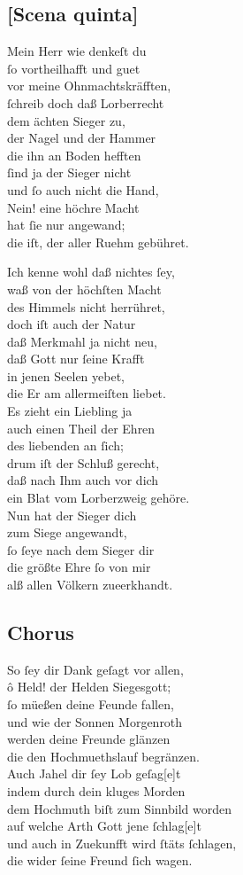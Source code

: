 \documentclass{ees}
\newenvironment{lyrics}[1]{%
  \subsection{#1}\nopagebreak%
  \begin{lyricslist}%
  \let\voice\item%
}{%
  \end{lyricslist}%
}
\begin{document}
\begin{lyrics}{[Scena quinta]}
  \voice[Jahel]
  Mein Herr wie denkeſt du\\
  ſo vortheilhafft und guet\\
  vor meine Ohnmachtskräfften,\\
  ſchreib doch daß Lorberrecht\\
  dem ächten Sieger zu,\\
  der Nagel und der Hammer\\
  die ihn an Boden hefften\\
  ſind ja der Sieger nicht\\
  und ſo auch nicht die Hand,\\
  Nein! eine höchre Macht\\
  hat ſie nur angewand;\\
  die iſt, der aller Ruehm gebühret.

  \voice[Barak]
  Ich kenne wohl daß nichtes ſey,\\
  waß von der höchſten Macht\\
  des Himmels nicht herrühret,\\
  doch iſt auch der Natur\\
  daß Merkmahl ja nicht neu,\\
  daß Gott nur ſeine Krafft\\
  in jenen Seelen yebet,\\
  die Er am allermeiſten liebet.\\
  Es zieht ein Liebling ja\\
  auch einen Theil der Ehren\\
  des liebenden an ſich;\\
  drum iſt der Schluß gerecht,\\
  daß nach Ihm auch vor dich\\
  ein Blat vom Lorberzweig gehöre.\\
  Nun hat der Sieger dich\\
  zum Siege angewandt,\\
  ſo ſeye nach dem Sieger dir\\
  die größte Ehre ſo von mir\\
  alß allen Völkern zueerkhandt.
\end{lyrics}

\begin{lyrics}{Chorus}
  \voice[Chorus der Israelitern]
  So ſey dir Dank geſagt vor allen,\\
  ô Held! der Helden Siegesgott;\\
  ſo müeßen deine Feunde fallen,\\
  und wie der Sonnen Morgenroth\\
  werden deine Freunde glänzen\\
  die den Hochmuethslauf begränzen.\\[1ex]
  Auch Jahel dir ſey Lob geſag[e]t\\
  indem durch dein kluges Morden\\
  dem Hochmuth biſt zum Sinnbild worden\\
  auf welche Arth Gott jene ſchlag[e]t\\
  und auch in Zuekunfft wird ſtäts ſchlagen,\\
  die wider ſeine Freund ſich wagen.
\end{lyrics}
\end{document}
